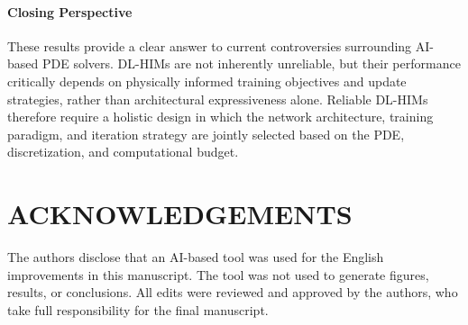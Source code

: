 \documentclass[11pt]{article}
\begin{document}
\paragraph{Closing Perspective} These results provide a clear answer to current controversies surrounding AI-based PDE solvers. DL-HIMs are not inherently unreliable, but their performance critically depends on physically informed training objectives and update strategies, rather than architectural expressiveness alone. Reliable DL-HIMs therefore require a holistic design in which the network architecture, training paradigm, and iteration strategy are jointly selected based on the PDE, discretization, and computational budget.

\section{ACKNOWLEDGEMENTS}
The authors disclose that an AI-based tool was used for the English improvements in this manuscript. The tool was not used to generate figures, results, or conclusions. All edits were reviewed and approved by the authors, who take full responsibility for the final manuscript.

\def\refname{REFERENCES}


\end{document}
